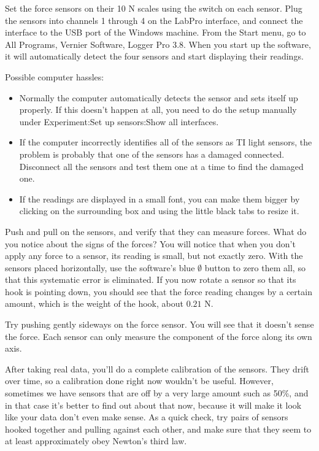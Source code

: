 Set the force sensors on their 10 N scales using the switch on each
sensor.
Plug the sensors into channels 1 through 4 on the LabPro interface, and connect the
interface to the USB port of the Windows machine.
From the Start menu, go to All Programs, Vernier Software, Logger Pro 3.8.
When you start up the software, it will automatically detect
the four sensors and start displaying their readings. 


Possible computer hassles:
\begin{itemize}
\item[] Normally the computer automatically detects the sensor and sets itself up
properly. If this doesn't happen at all, you need to do the setup manually under
Experiment:Set up sensors:Show all interfaces.
\item[] If the computer incorrectly identifies all of the sensors as TI light sensors,
the problem is probably that one of the sensors has a damaged connected. Disconnect
all the sensors and test them one at a time to find the damaged one.
\item[] If the readings are displayed in a small font, you can make them bigger
by clicking on the surrounding box and using the little black tabs to resize it.
\end{itemize}

Push and pull on the sensors, and verify that they can measure forces.
What do you notice about the signs of the forces?
You will notice that when you don't apply any force to a sensor, its reading
is small, but not exactly zero.
With the sensors placed horizontally, use the software's blue $\emptyset$ button to zero them all, so that
this systematic error is eliminated. If you now rotate a sensor so that its hook
is pointing down, you should see that the force reading changes by a certain amount,
which is the weight of the hook, about $0.21$ N.

Try pushing gently sideways on the force sensor. You will see that it doesn't
sense the force.
Each sensor can only measure the component of the force along its
own axis.

After taking real data, you'll do a complete calibration of the
sensors. They drift over time, so a calibration done right now wouldn't be useful.
However, sometimes we have sensors that are off by a very large
amount such as 50\%, and in that case it's better to find out about that now, because
it will make it look like your data don't even make sense. As a quick check, try
pairs of sensors hooked together and pulling against each other, and make sure that
they seem to at least approximately obey Newton's third law.

